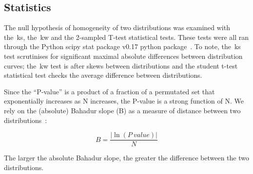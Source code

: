 \subsection{Statistics}

The null hypothesis of homogeneity of two distributions was examined with the~\gls{ks}, the~\gls{kw} and the 2-sampled T-test statistical tests.
These tests were all ran through the Python scipy stat package v0.17 python package~\cite{VanderWalt2011}.
To note, the~\gls{ks} test scrutinises for significant maximal absolute differences between distribution curves; the~\gls{kw} test is after skews between distributions and the student t-test statistical test checks the average difference between distributions.

Since the ``P‑value'' is a product of a fraction of a permutated set that exponentially increases as N increases, the P-value is a strong function of N.
We rely on the (absolute) Bahadur slope (B) as a measure of distance between two distributions~\cite{Bahadur1967, Bahadur1971, Sunyaev1998, Baker2017}:

\begin{equation} \label{eq:bahadur2}
B=\frac{|\ln(P~value)|}{N}
\end{equation}

The larger the absolute Bahadur slope, the greater the difference between the two distributions.
